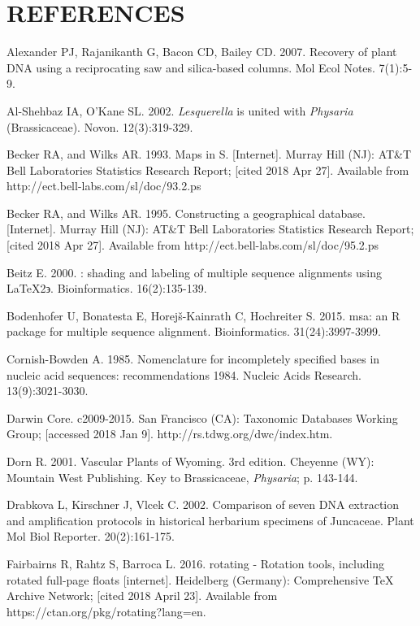 {}
\chapter*{REFERENCES}

\setlength{\parindent}{-4em}
\setlength{\leftskip}{4em}
\setlength{\parskip}{11pt}
\singlespacing

\hspace*{-4em} Alexander PJ, Rajanikanth G, Bacon CD, Bailey CD. 2007. Recovery of plant DNA using a reciprocating saw and silica-based columns. Mol Ecol Notes. 7(1):5-9.

Al-Shehbaz IA, O’Kane SL. 2002. \textit{Lesquerella} is united with \textit{Physaria} (Brassicaceae). Novon. 12(3):319-329.

Becker RA, and Wilks AR. 1993. Maps in S. [Internet]. Murray Hill (NJ): AT\&T Bell Laboratories Statistics Research Report; [cited 2018 Apr 27]. Available from http://ect.bell-labs.com/sl/doc/93.2.ps

Becker RA, and Wilks AR. 1995. Constructing a geographical database. [Internet]. Murray Hill (NJ): AT\&T Bell Laboratories Statistics Research Report; [cited 2018 Apr 27]. Available from http://ect.bell-labs.com/sl/doc/95.2.ps

Beitz E. 2000. \TeXshade: shading and labeling of multiple sequence alignments using \LaTeX 2$\backepsilon$. Bioinformatics. 16(2):135-139.

Bodenhofer U, Bonatesta E, Horej\v{s}-Kainrath C, Hochreiter S. 2015. msa: an R package for multiple sequence alignment. Bioinformatics. 31(24):3997-3999. 

Cornish-Bowden A. 1985. Nomenclature for incompletely specified bases in nucleic acid sequences: recommendations 1984.  Nucleic Acids Research. 13(9):3021-3030.

Darwin Core. c2009-2015. San Francisco (CA): Taxonomic Databases Working Group; [accessed 2018 Jan 9]. http://rs.tdwg.org/dwc/index.htm.

Dorn R. 2001. Vascular Plants of Wyoming. 3rd edition. Cheyenne (WY): Mountain West Publishing. Key to Brassicaceae, \textit{Physaria}; p. 143-144.

Drabkova L, Kirschner J, Vlcek C. 2002. Comparison of seven DNA extraction and amplification protocols in historical herbarium specimens of Juncaceae. Plant Mol Biol Reporter. 20(2):161-175.

Fairbairns R, Rahtz S, Barroca L. 2016. rotating - Rotation tools, including rotated full-page floats [internet]. Heidelberg (Germany): Comprehensive TeX Archive Network; [cited 2018 April 23]. Available from https://ctan.org/pkg/rotating?lang=en.

